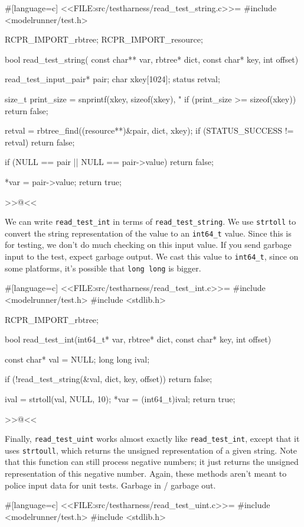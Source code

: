 {#[language=c]
<<FILE:src/testharness/read_test_string.c>>=
#include <modelrunner/test.h>

RCPR_IMPORT_rbtree;
RCPR_IMPORT_resource;

bool read_test_string(
    const char** var, rbtree* dict, const char* key, int offset)
{
    read_test_input_pair* pair;
    char xkey[1024];
    status retval;

    size_t print_size = snprintf(xkey, sizeof(xkey), "%
    if (print_size >= sizeof(xkey))
    {
        return false;
    }

    retval = rbtree_find((resource**)&pair, dict, xkey);
    if (STATUS_SUCCESS != retval)
    {
        return false;
    }

    if (NULL == pair || NULL == pair->value)
    {
        return false;
    }

    *var = pair->value;
    return true;
}
>>@<<

We can write \verb/read_test_int/ in terms of \verb/read_test_string/. We use
\verb/strtoll/ to convert the string representation of the value to an
\verb/int64_t/ value. Since this is for testing, we don't do much checking on
this input value. If you send garbage input to the test, expect garbage output.
We cast this value to \verb/int64_t/, since on some platforms, it's possible
that \verb/long long/ is bigger.

#[language=c]
<<FILE:src/testharness/read_test_int.c>>=
#include <modelrunner/test.h>
#include <stdlib.h>

RCPR_IMPORT_rbtree;

bool read_test_int(int64_t* var, rbtree* dict, const char* key, int offset)
{
    const char* val = NULL;
    long long ival;

    if (!read_test_string(&val, dict, key, offset))
    {
        return false;
    }

    ival = strtoll(val, NULL, 10);
    *var = (int64_t)ival;
    return true;
}
>>@<<

Finally, \verb/read_test_uint/ works almost exactly like \verb/read_test_int/,
except that it uses \verb/strtoull/, which returns the unsigned representation
of a given string. Note that this function can still process negative numbers;
it just returns the unsigned representation of this negative number. Again,
these methods aren't meant to police input data for unit tests. Garbage in /
garbage out.

#[language=c]
<<FILE:src/testharness/read_test_uint.c>>=
#include <modelrunner/test.h>
#include <stdlib.h>

}
